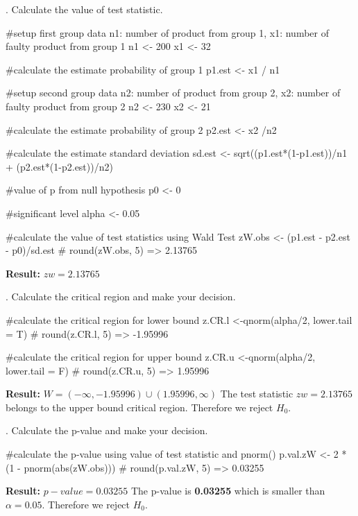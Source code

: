 \documentclass[12pt, oneside]{report}\usepackage[]{graphicx}\usepackage[]{color}
\begin{document}
. Calculate the value of test statistic.
\begin{Schunk}
\begin{Sinput}
#setup first group data n1: number of product from group 1, x1: number of faulty product from group 1
n1 <- 200
x1 <- 32

#calculate the estimate probability of group 1
p1.est <- x1 / n1

#setup second group data n2: number of product from group 2, x2: number of faulty product from group 2
n2 <- 230
x2 <- 21

#calculate the estimate probability of group 2
p2.est <- x2 /n2

#calculate the estimate standard deviation
sd.est <- sqrt((p1.est*(1-p1.est))/n1 + (p2.est*(1-p2.est))/n2)

#value of p from null hypothesis
p0 <- 0

#significant level
alpha <- 0.05

#calculate the value of test statistics using Wald Test
zW.obs <- (p1.est - p2.est - p0)/sd.est
# round(zW.obs, 5) => 2.13765
\end{Sinput}
\end{Schunk}
{\bf Result:} $zw = 2.13765 $ \newline

. Calculate the critical region and make your decision.
\begin{Schunk}
\begin{Sinput}
#calculate the critical region for lower bound
z.CR.l <-qnorm(alpha/2, lower.tail = T)
# round(z.CR.l, 5) => -1.95996

#calculate the critical region for upper bound
z.CR.u <-qnorm(alpha/2, lower.tail = F)
# round(z.CR.u, 5) => 1.95996
\end{Sinput}
\end{Schunk}
{\bf Result:} $W = (-\infty, -1.95996) \cup (1.95996, \infty) $ \newline
The test statistic $zw = 2.13765$ belongs to the upper bound critical region. Therefore we reject $H_0$. \newline

. Calculate the p-value and make your decision.
\begin{Schunk}
\begin{Sinput}
#calculate the p-value using value of test statistic and pnorm()
p.val.zW <- 2 * (1 - pnorm(abs(zW.obs)))
# round(p.val.zW, 5) => 0.03255
\end{Sinput}
\end{Schunk}
{\bf Result:} $p-value = 0.03255$ \newline
The p-value is {\bf 0.03255} which is smaller than $\alpha = 0.05$. Therefore we reject $H_0$. \newline
\end{document}
